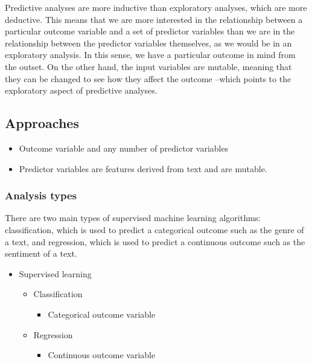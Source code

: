\documentclass[
  letterpaper,
]{latex/krantz}
\providecommand{\tightlist}{%
  \setlength{\itemsep}{0pt}\setlength{\parskip}{0pt}}\usepackage{longtable,booktabs,array}
\begin{document}
Predictive analyses are more inductive than exploratory analyses, which
are more deductive. This means that we are more interested in the
relationship between a particular outcome variable and a set of
predictor variables than we are in the relationship between the
predictor variables themselves, as we would be in an exploratory
analysis. In this sense, we have a particular outcome in mind from the
outset. On the other hand, the input variables are mutable, meaning that
they can be changed to see how they affect the outcome --which points to
the exploratory aspect of predictive analyses.

\hypertarget{pda-approaches}{%
\subsection{Approaches}\label{pda-approaches}}

\begin{itemize}
\tightlist
\item
  Outcome variable and any number of predictor variables
\item
  Predictor variables are features derived from text and are mutable.
\end{itemize}

\hypertarget{pda-analysis-types}{%
\subsubsection{Analysis types}\label{pda-analysis-types}}

There are two main types of supervised machine learning algorithms:
classification, which is used to predict a categorical outcome such as
the genre of a text, and regression, which is used to predict a
continuous outcome such as the sentiment of a text.

\begin{itemize}
\tightlist
\item
  Supervised learning

  \begin{itemize}
  \tightlist
  \item
    Classification

    \begin{itemize}
    \tightlist
    \item
      Categorical outcome variable
    \end{itemize}
  \item
    Regression

    \begin{itemize}
    \tightlist
    \item
      Continuous outcome variable
    \end{itemize}
  \end{itemize}
\end{itemize}
\end{document}
